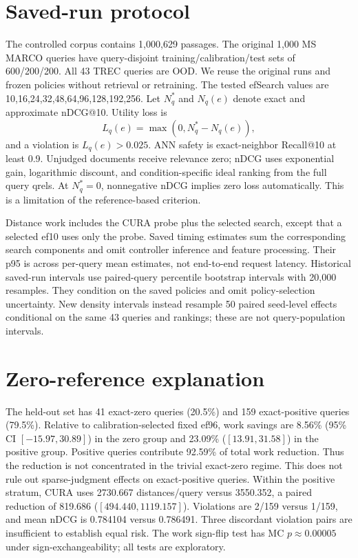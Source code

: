 \documentclass[10pt,twocolumn]{article}
\begin{document}
\section{Saved-run protocol}
The controlled corpus contains 1,000,629 passages. The original 1,000 MS MARCO queries have query-disjoint training/calibration/test sets of 600/200/200. All 43 TREC queries are OOD. We reuse the original runs and frozen policies without retrieval or retraining.
The tested efSearch values are 10,16,24,32,48,64,96,128,192,256.
Let $N_q^*$ and $N_q(e)$ denote exact and approximate nDCG@10. Utility loss is
\[
L_q(e)=\max(0,N_q^*-N_q(e)),
\]
and a violation is $L_q(e)>0.025$. ANN safety is exact-neighbor Recall@10 at least 0.9. Unjudged documents receive relevance zero; nDCG uses exponential gain, logarithmic discount, and condition-specific ideal ranking from the full query qrels.
At $N_q^*=0$, nonnegative nDCG implies zero loss automatically. This is a limitation of the reference-based criterion.

Distance work includes the CURA probe plus the selected search, except that a selected ef10 uses only the probe. Saved timing estimates sum the corresponding search components and omit controller inference and feature processing. Their p95 is across per-query mean estimates, not end-to-end request latency.
Historical saved-run intervals use paired-query percentile bootstrap intervals with 20,000 resamples. They condition on the saved policies and omit policy-selection uncertainty. New density intervals instead resample 50 paired seed-level effects conditional on the same 43 queries and rankings; these are not query-population intervals.

\section{Zero-reference explanation}
The held-out set has 41 exact-zero queries (20.5\%) and 159 exact-positive queries (79.5\%). Relative to calibration-selected fixed ef96, work savings are 8.56\% (95\% CI $[-15.97,30.89]$) in the zero group and 23.09\% ($[13.91,31.58]$) in the positive group. Positive queries contribute 92.59\% of total work reduction.
Thus the reduction is not concentrated in the trivial exact-zero regime. This does not rule out sparse-judgment effects on exact-positive queries.
Within the positive stratum, CURA uses 2730.667 distances/query versus 3550.352, a paired reduction of 819.686 ($[494.440,1119.157]$). Violations are 2/159 versus 1/159, and mean nDCG is 0.784104 versus 0.786491. Three discordant violation pairs are insufficient to establish equal risk. The work sign-flip test has MC $p\approx0.00005$ under sign-exchangeability; all tests are exploratory.
\end{document}
